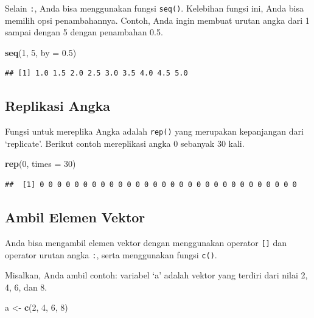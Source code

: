 \documentclass[openany]{book}
\newenvironment{Shaded}{\begin{snugshade}}{\end{snugshade}}
\newcommand{\KeywordTok}[1]{\textcolor[rgb]{0.13,0.29,0.53}{\textbf{#1}}}
\newcommand{\DataTypeTok}[1]{\textcolor[rgb]{0.13,0.29,0.53}{#1}}
\newcommand{\DecValTok}[1]{\textcolor[rgb]{0.00,0.00,0.81}{#1}}
\newcommand{\FloatTok}[1]{\textcolor[rgb]{0.00,0.00,0.81}{#1}}
\newcommand{\StringTok}[1]{\textcolor[rgb]{0.31,0.60,0.02}{#1}}
\newcommand{\NormalTok}[1]{#1}
\begin{document}
Selain \texttt{:}, Anda bisa menggunakan fungsi \texttt{seq()}.
Kelebihan fungsi ini, Anda bisa memilih opsi penambahannya. Contoh, Anda
ingin membuat urutan angka dari 1 sampai dengan 5 dengan penambahan 0.5.

\begin{Shaded}
\begin{Highlighting}[]
\KeywordTok{seq}\NormalTok{(}\DecValTok{1}\NormalTok{, }\DecValTok{5}\NormalTok{, }\DataTypeTok{by =} \FloatTok{0.5}\NormalTok{)}
\end{Highlighting}
\end{Shaded}

\begin{verbatim}
## [1] 1.0 1.5 2.0 2.5 3.0 3.5 4.0 4.5 5.0
\end{verbatim}

\subsection{Replikasi Angka}\label{replikasi-angka}

Fungsi untuk mereplika Angka adalah \texttt{rep()} yang merupakan
kepanjangan dari `replicate'. Berikut contoh mereplikasi angka 0
sebanyak 30 kali.

\begin{Shaded}
\begin{Highlighting}[]
\KeywordTok{rep}\NormalTok{(}\DecValTok{0}\NormalTok{, }\DataTypeTok{times =} \DecValTok{30}\NormalTok{)}
\end{Highlighting}
\end{Shaded}

\begin{verbatim}
##  [1] 0 0 0 0 0 0 0 0 0 0 0 0 0 0 0 0 0 0 0 0 0 0 0 0 0 0 0 0 0 0
\end{verbatim}

\subsection{Ambil Elemen Vektor}\label{ambil-elemen-vektor}

Anda bisa mengambil elemen vektor dengan menggunakan operator
\texttt{{[}{]}} dan operator urutan angka \texttt{:}, serta menggunakan
fungsi \texttt{c()}.

Misalkan, Anda ambil contoh: variabel `a' adalah vektor yang terdiri
dari nilai 2, 4, 6, dan 8.

\begin{Shaded}
\begin{Highlighting}[]
\NormalTok{a <-}\StringTok{ }\KeywordTok{c}\NormalTok{(}\DecValTok{2}\NormalTok{, }\DecValTok{4}\NormalTok{, }\DecValTok{6}\NormalTok{, }\DecValTok{8}\NormalTok{)}
\end{Highlighting}
\end{Shaded}
\end{document}
